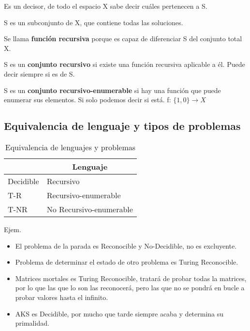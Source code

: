Es un decisor, de todo el espacio X sabe decir cuáles pertenecen a S.

S es un subconjunto de X, que contiene todas las soluciones.

Se llama \textbf{función recursiva} porque es capaz de diferenciar S del conjunto total X.

S es un \textbf{conjunto recursivo} si existe una función recursiva aplicable a él. Puede decir siempre si es de S.

S es un \textbf{conjunto recursivo-enumerable} si hay una función que puede enumerar sus elementos. Si solo podemos decir si está. f: $\{1,0\}\rightarrow X$

\subsection{Equivalencia de lenguaje y tipos de problemas}
\begin{table}[H]
	\begin{tabular}{|l|l|}
		\hline
		\rowcolor[HTML]{BFBFBF}
		\multicolumn{1}{|c|}{\cellcolor[HTML]{BFBFBF}Problema} & \multicolumn{1}{c|}{\cellcolor[HTML]{BFBFBF}Lenguaje} \\ \hline
		Decidible                                              & Recursivo                                             \\ \hline
		T-R                                                    & Recursivo-enumerable                                  \\ \hline
		T-NR                                                   & No Recursivo-enumerable                               \\ \hline
	\end{tabular}
	\caption{Equivalencia de lenguajes y problemas}
\end{table}

Ejem.
\begin{itemize}
	\item El problema de la parada es Reconocible y No-Decidible, no es excluyente.
	\item Problema de determinar el estado de otro problema es Turing Reconocible.
	\item Matrices mortales es Turing Reconocible, tratará de probar todas la matrices, por lo que las que lo son las reconocerá, pero las que no se pondrá en bucle a probar valores hasta el infinito.
	\item AKS es Decidible, por mucho que tarde siempre acaba y determina su primalidad.
\end{itemize}

